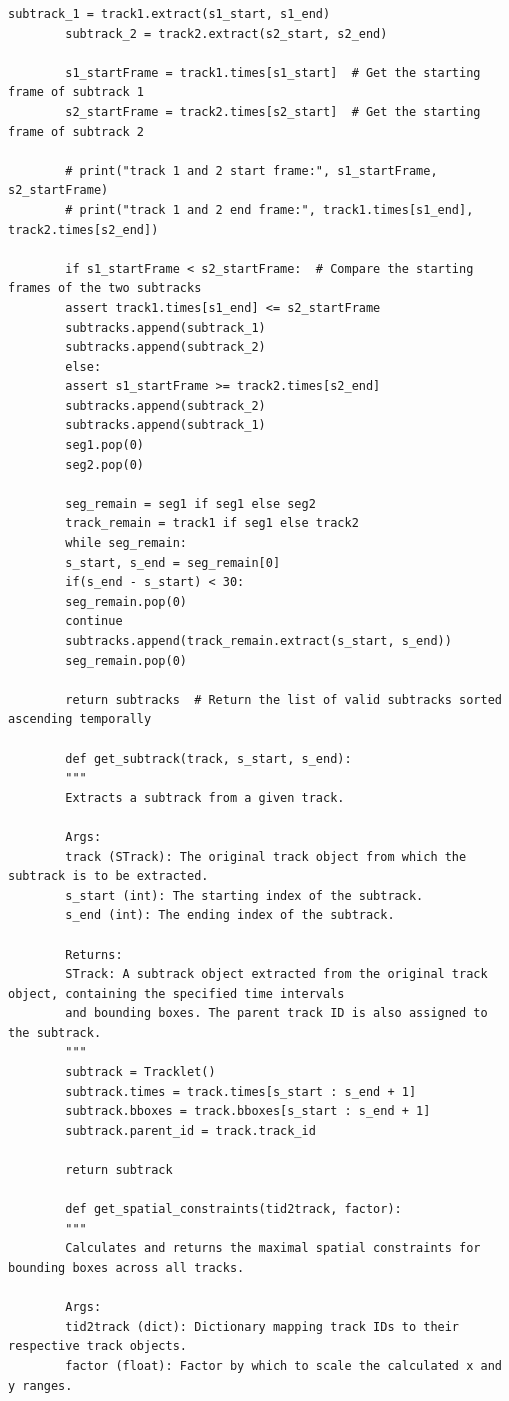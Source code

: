 \documentclass[12pt, a4paper, twoside]{article}
\begin{document}
\begin{lstlisting}[style=pythonstyle]
		subtrack_1 = track1.extract(s1_start, s1_end)
		subtrack_2 = track2.extract(s2_start, s2_end)
		
		s1_startFrame = track1.times[s1_start]  # Get the starting frame of subtrack 1
		s2_startFrame = track2.times[s2_start]  # Get the starting frame of subtrack 2
		
		# print("track 1 and 2 start frame:", s1_startFrame, s2_startFrame)
		# print("track 1 and 2 end frame:", track1.times[s1_end], track2.times[s2_end])
		
		if s1_startFrame < s2_startFrame:  # Compare the starting frames of the two subtracks
		assert track1.times[s1_end] <= s2_startFrame
		subtracks.append(subtrack_1)
		subtracks.append(subtrack_2)
		else:
		assert s1_startFrame >= track2.times[s2_end]
		subtracks.append(subtrack_2)
		subtracks.append(subtrack_1)
		seg1.pop(0)
		seg2.pop(0)
		
		seg_remain = seg1 if seg1 else seg2
		track_remain = track1 if seg1 else track2
		while seg_remain:
		s_start, s_end = seg_remain[0]
		if(s_end - s_start) < 30:
		seg_remain.pop(0)
		continue
		subtracks.append(track_remain.extract(s_start, s_end))
		seg_remain.pop(0)
		
		return subtracks  # Return the list of valid subtracks sorted ascending temporally
		
		def get_subtrack(track, s_start, s_end):
		"""
		Extracts a subtrack from a given track.
		
		Args:
		track (STrack): The original track object from which the subtrack is to be extracted.
		s_start (int): The starting index of the subtrack.
		s_end (int): The ending index of the subtrack.
		
		Returns:
		STrack: A subtrack object extracted from the original track object, containing the specified time intervals
		and bounding boxes. The parent track ID is also assigned to the subtrack.
		"""
		subtrack = Tracklet()
		subtrack.times = track.times[s_start : s_end + 1]
		subtrack.bboxes = track.bboxes[s_start : s_end + 1]
		subtrack.parent_id = track.track_id
		
		return subtrack
		
		def get_spatial_constraints(tid2track, factor):
		"""
		Calculates and returns the maximal spatial constraints for bounding boxes across all tracks.
		
		Args:
		tid2track (dict): Dictionary mapping track IDs to their respective track objects.
		factor (float): Factor by which to scale the calculated x and y ranges.
		

\end{lstlisting}
\end{document}
